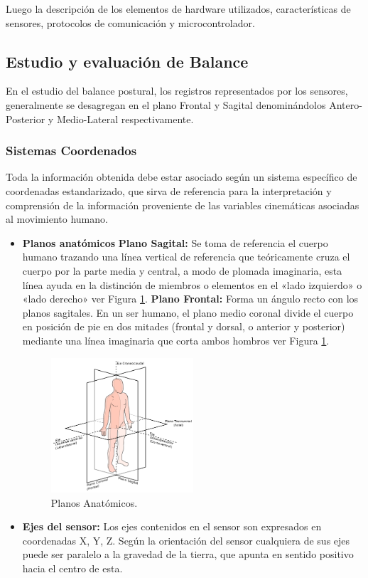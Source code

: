 \documentclass[12pt,a4paper]{article}
\begin{document}
Luego la descripción de los elementos de hardware utilizados, características de sensores, protocolos de comunicación y microcontrolador.


\subsection{Estudio y evaluación de Balance}

En el estudio del balance postural, los registros representados por los sensores, generalmente se desagregan en el plano Frontal y Sagital denominándolos Antero-Posterior y Medio-Lateral respectivamente. 

\subsubsection{Sistemas Coordenados}

Toda la información obtenida debe estar asociado según un sistema específico de coordenadas estandarizado, que sirva de referencia para la interpretación y comprensión de la información proveniente de las variables cinemáticas asociadas al movimiento humano.

\begin{itemize}
	
	\item \textbf{Planos anatómicos} 
	\subitem \textbf{Plano Sagital:}
	Se toma de referencia el cuerpo humano trazando  una línea vertical de referencia que teóricamente cruza el cuerpo por la parte media y central, a modo de plomada imaginaria, esta línea ayuda en la distinción de miembros o elementos en el «lado izquierdo» o «lado derecho» ver Figura \ref{fig:sagital}.
	\subitem \textbf{Plano Frontal:} Forma un ángulo recto con los planos sagitales. En un ser humano, el plano medio coronal divide el cuerpo en posición de pie en dos mitades (frontal y dorsal, o anterior y posterior) mediante una línea imaginaria que corta ambos hombros ver Figura \ref{fig:sagital}.
	
	\begin{figure}[H]
		\centering
		\includegraphics[width=0.5\textwidth]{images/planosAnatomicos}
		\caption{Planos Anatómicos.}
		\label{fig:sagital}
	\end{figure}
	
	\item \textbf{Ejes del sensor:} Los ejes contenidos en el sensor son expresados en coordenadas X, Y, Z.
	Según la orientación del sensor cualquiera de sus ejes puede ser paralelo a la gravedad de la tierra, que apunta en sentido positivo hacia el centro de esta.
\end{itemize}
\end{document}
